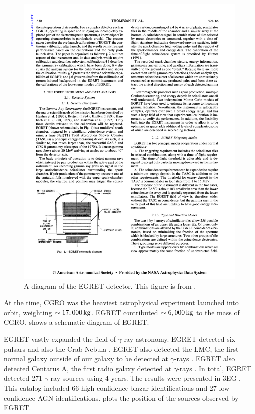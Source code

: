 \begin{figure}[htbp]
\centering
\includegraphics{chapters/introduction/figures/egret_detector.pdf}
\caption{A diagram of the \ac{EGRET} detector.
This figure is from \citep{thompson_1993a_calibration-energetic}.}
\end{figure}

At the time, \ac{CGRO} was the heaviest astrophysical experiment
launched into orbit, weighting $\sim17,000\,\text{kg}$. \ac{EGRET}
contributed $\sim6,000\,\text{kg}$ to the mass of \ac{CGRO}.
 shows a schematic diagram of \ac{EGRET}.

\ac{EGRET} vastly expanded the field of $\gamma$-ray astronomy.
\ac{EGRET} detected six pulsars \citep{nolan_1996a_egret-observations} and
also the Crab Nebula \cite{nolan_1993a_observations-pulsar}.  \ac{EGRET}
also detected the LMC, the first normal galaxy outside of our galaxy to
be detected at $\gamma$-rays \citep{sreekumar_1992a_observations-large}.
\ac{EGRET} also detected Centarus A, the first radio galaxy detected
at $\gamma$-rays \cite{sreekumar_1999a_emission-nearby}.  In total,
EGRET detected 271 $\gamma$-ray sources using 4 years.  The results were
presented in \ac{3EG} \citep{hartman_1999a_third-egret}. This catalog
included 66 high confidence blazar identifications and 27 low-confidence
AGN identifications.  plots the
position of the sources observed by \ac{EGRET}.

